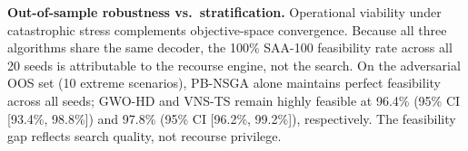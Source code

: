 \documentclass{llncs}
\begin{document}

\textbf{Out-of-sample robustness vs.\ stratification.} Operational viability under catastrophic stress complements objective-space convergence. Because all three algorithms share the same decoder, the 100\% SAA-100 feasibility rate across all 20 seeds is attributable to the recourse engine, not the search. On the adversarial OOS set (10 extreme scenarios), PB-NSGA alone maintains perfect feasibility across all seeds; GWO-HD and VNS-TS remain highly feasible at 96.4\% (95\% CI [93.4\%, 98.8\%]) and 97.8\% (95\% CI [96.2\%, 99.2\%]), respectively. The feasibility gap reflects search quality, not recourse privilege.
\end{document}
